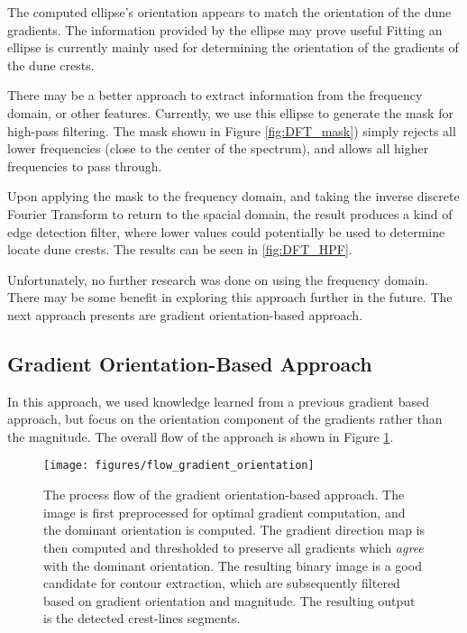 The computed ellipse's orientation appears to match the orientation of the dune gradients. The information provided by the ellipse may prove useful Fitting an ellipse is currently mainly used for determining the orientation of the gradients of the dune crests. 

There may be a better approach to extract information from the frequency domain, or other features. Currently, we use this ellipse to generate the mask for high-pass filtering. The mask shown in Figure \ref{fig:DFT_mask}) simply rejects all lower frequencies (close to the center of the spectrum), and allows all higher frequencies to pass through. 

Upon applying the mask to the frequency domain, and taking the inverse discrete Fourier Transform to return to the spacial domain, the result produces a kind of edge detection filter, where lower values could potentially be used to determine locate dune crests. The results can be seen in \ref{fig:DFT_HPF}.

Unfortunately, no further research was done on using the frequency domain. There may be some benefit in exploring this approach further in the future. The next approach presents are gradient orientation-based approach.




\subsection{Gradient Orientation-Based Approach} \label{subsec:gradient_orientation_based}
In this approach, we used knowledge learned from a previous gradient based approach, but focus on the orientation component of the gradients rather than the magnitude. The overall flow of the approach is shown in Figure \ref{fig:flow_gradient_orientation}. 

\begin{figure}[H]
	\centering
	\texttt{[image: figures/flow\_gradient\_orientation]}
	\caption{The process flow of the gradient orientation-based approach. The image is first preprocessed for optimal gradient computation, and the dominant orientation is computed. The gradient direction map is then computed and thresholded to preserve all gradients which \emph{agree} with the dominant orientation. The resulting binary image is a good candidate for contour extraction, which are subsequently filtered based on gradient orientation and magnitude. The resulting output is the detected crest-lines segments. }
	\label{fig:flow_gradient_orientation}
\end{figure}

